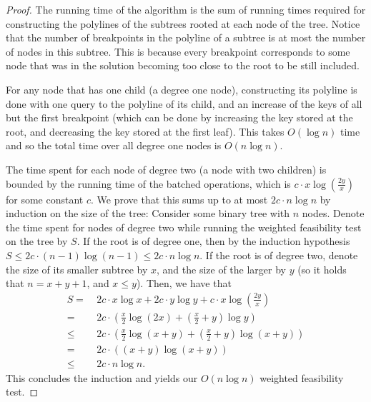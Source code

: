\documentclass[a4paper,UKenglish]{lipics-v2016}
\theoremstyle{plain}
\begin{document}
\begin{proof}The running time of the algorithm is the sum of running times required for constructing the polylines of the subtrees rooted at each node of the tree.
%
Notice that the number of breakpoints in the polyline of a subtree is at most the number of nodes in this subtree. This is because every breakpoint corresponds to some node that was in the solution becoming too close to the root to be still included.

For any node that has one child (a degree one node), constructing its polyline is done with one query to the polyline of its child, and an increase of the keys of all but the first breakpoint (which can be done by increasing the key stored at the root, and decreasing the key stored at the first leaf). This takes $O(\log n)$ time and so the total time over all degree one nodes is $O(n \log n)$.
 
The time spent for each node of degree two (a node with two children) is bounded by the running time of the batched operations, which is $c\cdot x \log (\frac{2y}{x})$ for some constant $c$. We prove that this sums up to at most $2c \cdot n \log n$ by induction on the size of the  tree: Consider some binary tree with $n$ nodes. Denote the time spent for nodes of degree two while running the weighted feasibility test on the tree by $S$. If the root is of degree one, then by the induction hypothesis $S \leq 2c\cdot (n-1)\log(n-1)\leq 2c\cdot n \log n$. If the root is of degree two, denote the size of its smaller subtree by $x$, and the size of the larger by $y$ (so it holds that $n=x+y+1$, and $x \leq y$). Then, we have that
\begin{align*}
S = & \ 2c\cdot x \log x + 2c\cdot y \log y + c\cdot x \log (\frac{2y}{x})\\
= & \ 2c\cdot (\frac{x}{2}\log(2x)+(\frac{x}{2}+y)\log y) \\
\leq & \ 2c\cdot (\frac{x}{2}\log(x+y)+(\frac{x}{2}+y)\log (x+y)) \\
= & \ 2c\cdot ((x+y)\log(x+y)) \\
\leq & \ 2c\cdot n \log n.
\end{align*}
This concludes the induction and yields our $O(n \log n)$ weighted feasibility test.
\end{proof}
\end{document}
